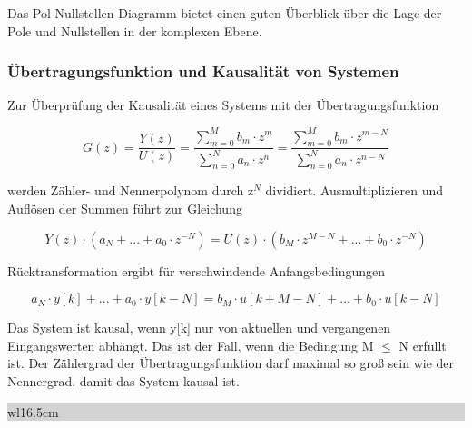 \noindent Das Pol-Nullstellen-Diagramm bietet einen guten \"{U}berblick \"{u}ber die Lage der Pole und Nullstellen in der komplexen Ebene.

\subsubsection{\"{U}bertragungsfunktion und Kausalit\"{a}t von Systemen}

\noindent Zur \"{U}berpr\"{u}fung der Kausalit\"{a}t eines Systems mit der \"{U}bertragungsfunktion 

\begin{equation}\label{eq:sixseventeight}
G\left(z\right)=\frac{Y\left(z\right)}{U\left(z\right)} =\frac{\sum _{m=0}^{M}b_{m} \cdot z^{m}  }{\sum _{n=0}^{N}a_{n} \cdot z^{n}  } =\frac{\sum _{m=0}^{M}b_{m} \cdot z^{m-N}  }{\sum _{n=0}^{N}a_{n} \cdot z^{n-N}  }
\end{equation}

\noindent werden Z\"{a}hler- und Nennerpolynom durch z${}^{N}$ dividiert. Ausmultiplizieren und Aufl\"{o}sen der Summen f\"{u}hrt zur Gleichung 

\begin{equation}\label{eq:sixseventnine}
Y\left(z\right)\cdot \left(a_{N} +...+a_{0} \cdot z^{-N} \right)=U\left(z\right)\cdot \left(b_{M} \cdot z^{M-N} +...+b_{0} \cdot z^{-N} \right)
\end{equation}

\noindent R\"{u}cktransformation ergibt f\"{u}r verschwindende Anfangsbedingungen 

\begin{equation}\label{eq:sixseighty}
a_{N} \cdot y\left[k\right]+...+a_{0} \cdot y\left[k-N\right]=b_{M} \cdot u\left[k+M-N\right]+...+b_{0} \cdot u\left[k-N\right]
\end{equation}

\noindent Das System ist kausal, wenn y[k] nur von aktuellen und vergangenen Eingangswerten abh\"{a}ngt. Das ist der Fall, wenn die Bedingung M $\leq$ N erf\"{u}llt ist. Der Z\"{a}hlergrad der \"{U}bertragungsfunktion darf maximal so gro{\ss} sein wie der Nennergrad, damit das System kausal ist.\bigskip

\noindent
\colorbox{lightgray}{%
%
\renewcommand\arraystretch{0.6}%
\begin{tabular}{ wl{16.5cm} }
{\selectfont{Beispiel: Nicht kausales System}}
\end{tabular}%
}\medskip

